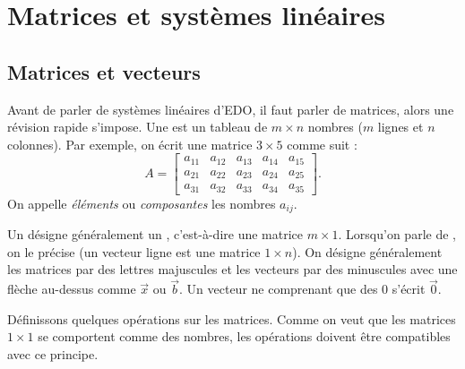 
\sectionnewpage
\section{Matrices et systèmes linéaires} \label{sec:matrix}


\subsection{Matrices et vecteurs}

Avant de parler de systèmes linéaires d’EDO, il faut parler de matrices, alors une révision rapide s'impose. Une \emph{} est un tableau de $m
\times n$ nombres ($m$ lignes et $n$ colonnes).  Par exemple, on écrit une matrice  $3 \times 5$ comme suit :
\begin{equation*}
A = 
\begin{bmatrix}
a_{11} & a_{12} & a_{13} & a_{14} & a_{15} \\
a_{21} & a_{22} & a_{23} & a_{24} & a_{25} \\
a_{31} & a_{32} & a_{33} & a_{34} & a_{35}
\end{bmatrix} .
\end{equation*}
On appelle \emph{éléments}
ou \emph{composantes} les nombres $a_{ij}$.

Un \emph{} désigne généralement un
\emph{}, c’est-à-dire une matrice $m \times 1$.
Lorsqu’on parle de \emph{}, on le précise (un vecteur ligne est une matrice $1 \times n$).
On désigne généralement les matrices par des lettres majuscules et les vecteurs par des minuscules avec une flèche au-dessus comme $\vec{x}$ ou $\vec{b}$.  Un vecteur ne comprenant que des 0 s’écrit $\vec{0}$.

Définissons quelques opérations sur les matrices. Comme on veut que les matrices $1 \times 1$ se comportent comme des nombres, les opérations doivent être compatibles avec ce principe.

